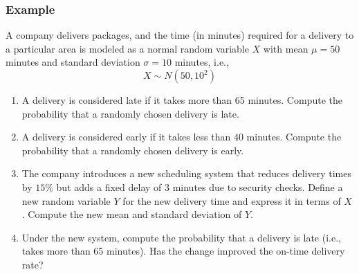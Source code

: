 \documentclass[t,8pt]{beamer}%
\begin{document}
\begin{frame}
    \frametitle{Example}
    A company delivers packages, and the time (in minutes) required for a delivery to a particular area is modeled as a normal random variable \(X\) with mean \(\mu = 50\) minutes and standard deviation \(\sigma = 10\) minutes, i.e.,  
    \[
    X \sim N(50, 10^2)
    \]
    \begin{enumerate}
        \item[(a)] A delivery is considered late if it takes more than 65 minutes. Compute the probability that a randomly chosen delivery is late.
        \item[(b)] A delivery is considered early if it takes less than 40 minutes. Compute the probability that a randomly chosen delivery is early.
        \item[(c)] The company introduces a new scheduling system that reduces delivery times by $15\%$ but adds a fixed delay of $3$ minutes due to security checks. Define a new random variable \(Y\) for the new delivery time and express it in terms of \(X\). Compute the new mean and standard deviation of \(Y\).
        \item[(d)] Under the new system, compute the probability that a delivery is late (i.e., takes more than 65 minutes). Has the change improved the on-time delivery rate?
    \end{enumerate}
\end{frame}
\end{document}
